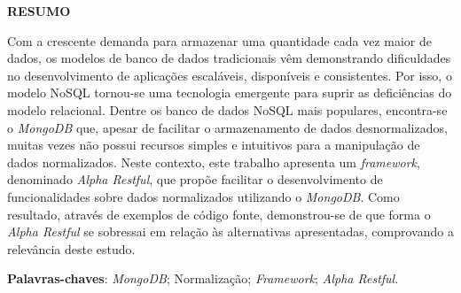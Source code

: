 \vfill
\begin{center}
{\textbf{RESUMO}\\}
\end{center}
\noindent

Com a crescente demanda para armazenar uma quantidade cada vez maior de dados, os modelos de banco de dados tradicionais vêm demonstrando dificuldades no desenvolvimento de aplicações escaláveis, disponíveis e consistentes. Por isso, o modelo NoSQL tornou-se uma tecnologia emergente para suprir as deficiências do modelo relacional. Dentre os banco de dados NoSQL mais populares, encontra-se o \textit{MongoDB} que, apesar de facilitar o armazenamento de dados desnormalizados, muitas vezes não possui recursos simples e intuitivos para a manipulação de dados normalizados. Neste contexto, este trabalho apresenta um \textit{framework}, denominado \textit{Alpha Restful}, que propõe facilitar o desenvolvimento de funcionalidades sobre dados normalizados utilizando o \textit{MongoDB}. Como resultado, através de exemplos de código fonte, demonstrou-se de que forma o \textit{Alpha Restful} se sobressai em relação às alternativas apresentadas, comprovando a relevância deste estudo.

\vspace{\onelineskip}
 \noindent
 \textbf{Palavras-chaves}: \textit{MongoDB}; Normalização; \textit{Framework}; \textit{Alpha Restful}.
